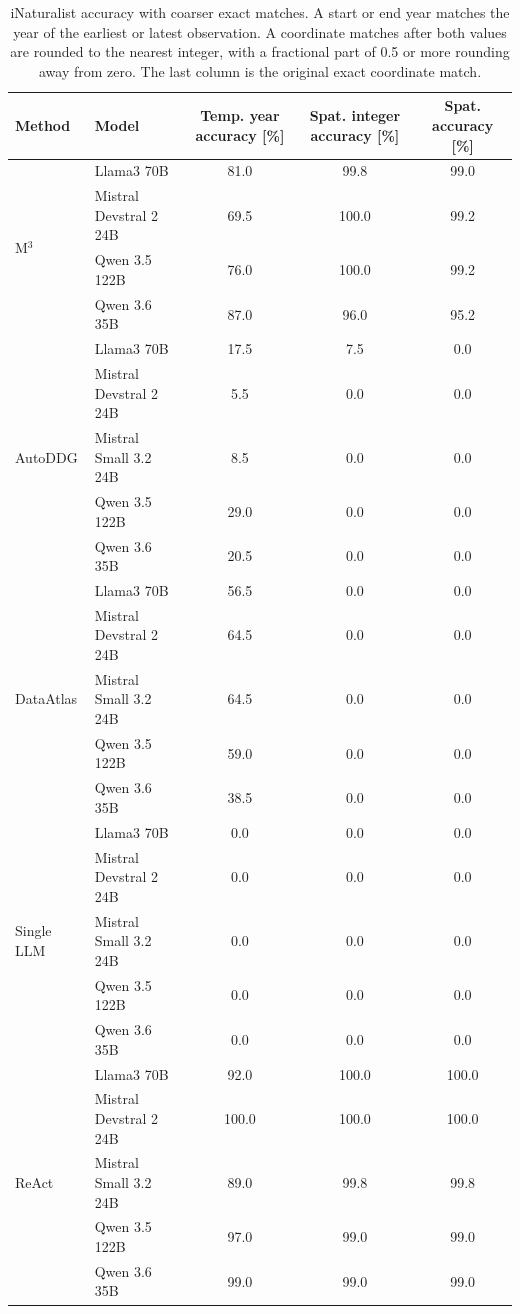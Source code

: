 \begin{table}
\caption{iNaturalist accuracy with coarser exact matches. A start or end year matches the year of the earliest or latest observation. A coordinate matches after both values are rounded to the nearest integer, with a fractional part of 0.5 or more rounding away from zero. The last column is the original exact coordinate match.}
\label{tab:all_models_inat_year}
\begin{tabular}{llccc}
\toprule
Method & Model & Temp. year accuracy [\%] & Spat. integer accuracy [\%] & Spat. accuracy [\%] \\
\midrule
\multirow[t]{4}{*}{M$^3$} & Llama3 70B & 81.0 & 99.8 & 99.0 \\
 & Mistral Devstral 2 24B & 69.5 & 100.0 & 99.2 \\
 & Qwen 3.5 122B & 76.0 & 100.0 & 99.2 \\
 & Qwen 3.6 35B & 87.0 & 96.0 & 95.2 \\
\midrule
\multirow[t]{5}{*}{AutoDDG} & Llama3 70B & 17.5 & 7.5 & 0.0 \\
 & Mistral Devstral 2 24B & 5.5 & 0.0 & 0.0 \\
 & Mistral Small 3.2 24B & 8.5 & 0.0 & 0.0 \\
 & Qwen 3.5 122B & 29.0 & 0.0 & 0.0 \\
 & Qwen 3.6 35B & 20.5 & 0.0 & 0.0 \\
\midrule
\multirow[t]{5}{*}{DataAtlas} & Llama3 70B & 56.5 & 0.0 & 0.0 \\
 & Mistral Devstral 2 24B & 64.5 & 0.0 & 0.0 \\
 & Mistral Small 3.2 24B & 64.5 & 0.0 & 0.0 \\
 & Qwen 3.5 122B & 59.0 & 0.0 & 0.0 \\
 & Qwen 3.6 35B & 38.5 & 0.0 & 0.0 \\
\midrule
\multirow[t]{5}{*}{Single LLM} & Llama3 70B & 0.0 & 0.0 & 0.0 \\
 & Mistral Devstral 2 24B & 0.0 & 0.0 & 0.0 \\
 & Mistral Small 3.2 24B & 0.0 & 0.0 & 0.0 \\
 & Qwen 3.5 122B & 0.0 & 0.0 & 0.0 \\
 & Qwen 3.6 35B & 0.0 & 0.0 & 0.0 \\
\midrule
\multirow[t]{5}{*}{ReAct} & Llama3 70B & 92.0 & 100.0 & 100.0 \\
 & Mistral Devstral 2 24B & 100.0 & 100.0 & 100.0 \\
 & Mistral Small 3.2 24B & 89.0 & 99.8 & 99.8 \\
 & Qwen 3.5 122B & 97.0 & 99.0 & 99.0 \\
 & Qwen 3.6 35B & 99.0 & 99.0 & 99.0 \\
\bottomrule
\end{tabular}
\end{table}
